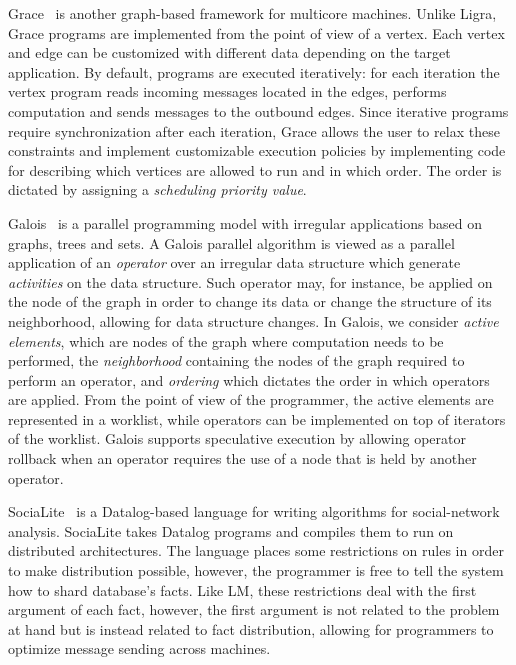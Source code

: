 Grace~\cite{wang:asynchronous} is another graph-based framework for multicore
machines. Unlike Ligra, Grace programs are implemented from the point of view of
a vertex. Each vertex and edge can be customized with different data depending
on the target application. By default, programs are executed iteratively: for
each iteration the vertex program reads incoming messages located in the edges,
performs computation and sends messages to the outbound edges. Since iterative
programs require synchronization after each iteration, Grace allows the user to
relax these constraints and implement customizable execution policies by
implementing code for describing which vertices are allowed to run and in which
order. The order is dictated by assigning a \emph{scheduling priority value}.

Galois~\cite{Pingali:2011:TPA:1993316.1993501} is a parallel programming model
with irregular applications based on graphs, trees and sets. A Galois parallel
algorithm is viewed as a parallel application of an \emph{operator} over an
irregular data structure which generate \emph{activities} on the data structure.
Such operator may, for instance, be applied on the node of the graph in order to
change its data or change the structure of its neighborhood, allowing for data
structure changes. In Galois, we consider \emph{active elements}, which are
nodes of the graph where computation needs to be performed, the
\emph{neighborhood} containing the nodes of the graph required to perform an
operator, and \emph{ordering} which dictates the order in which operators are
applied. From the point of view of the programmer, the active elements are
represented in a worklist, while operators can be implemented on top of
iterators of the worklist. Galois supports speculative execution by allowing
operator rollback when an operator requires the use of a node that is held by
another operator.

SociaLite~\cite{Seo:2013:DSD:2556549.2556572} is a Datalog-based language for
writing algorithms for social-network analysis. SociaLite takes Datalog programs
and compiles them to run on distributed architectures. The language places some
restrictions on rules in order to make distribution possible, however, the
programmer is free to tell the system how to shard database's facts. Like LM, these
restrictions deal with the first argument of each fact, however, the first
argument is not related to the problem at hand but is instead related to fact
distribution, allowing for programmers to optimize message sending across
machines.

